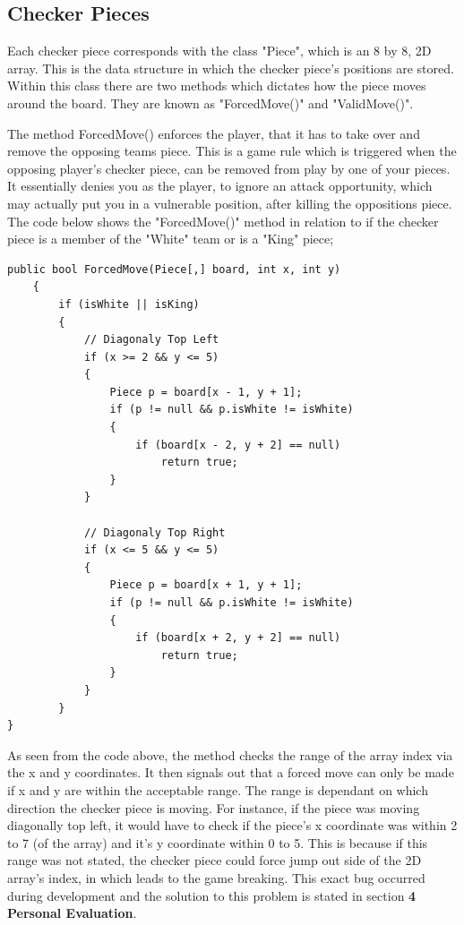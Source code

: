 \documentclass[10pt, a4paper]{article}
\begin{document}
	\subsection{Checker Pieces}
	Each checker piece corresponds with the class "Piece", which is an 8 by 8, 2D array. This is the data structure in which the checker piece's positions are stored. Within this class there are two methods which dictates how the piece moves around the board. They are known as "ForcedMove()" and "ValidMove()".
	
	The method ForcedMove() enforces the player, that it has to take over and remove the opposing teams piece. This is a game rule which is triggered when the opposing player's checker piece, can be removed from play by one of your pieces. It essentially denies you as the player, to ignore an attack opportunity, which may actually put you in a vulnerable position, after killing the oppositions piece. The code below shows the "ForcedMove()" method in relation to if the checker piece is a member of the "White" team or is a "King" piece;
	\begin{lstlisting}[caption = ForcedMove()]
public bool ForcedMove(Piece[,] board, int x, int y)
    {
        if (isWhite || isKing)
        {
            // Diagonaly Top Left
            if (x >= 2 && y <= 5)
            {
                Piece p = board[x - 1, y + 1];
                if (p != null && p.isWhite != isWhite)
                {
                    if (board[x - 2, y + 2] == null)
                        return true;
                }
            }
            
            // Diagonaly Top Right
            if (x <= 5 && y <= 5)
            {
                Piece p = board[x + 1, y + 1];
                if (p != null && p.isWhite != isWhite)
                {
                    if (board[x + 2, y + 2] == null)
                        return true;
                }
            }
        }
}
	\end{lstlisting}
	
	As seen from the code above, the method checks the range of the array index via the x and y coordinates. It then signals out that a forced move can only be made if x and y are within the acceptable range. The range is dependant on which direction the checker piece is moving. For instance, if the piece was moving diagonally top left, it would have to check if the piece's x coordinate was within 2 to 7 (of the array) and it's y coordinate within 0 to 5. This is because if this range was not stated, the checker piece could force jump out side of the 2D array's index, in which leads to the game breaking. This exact bug occurred during development and the solution to this problem is stated in section \textbf{4 Personal Evaluation}.
	
\end{document}
